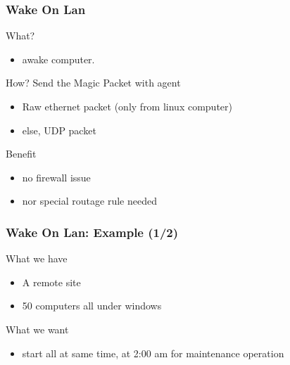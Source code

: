 \documentclass{beamer}
\begin{document}
\begin{frame}
    \frametitle{Wake On Lan}

    \begin{block}{What?}
    \begin{itemize}
        \item awake computer.
    \end{itemize}
    \end{block}

\pause

    \begin{block}{How?}
        Send the Magic Packet with agent
    \begin{itemize}
	\item Raw ethernet packet (only from linux computer)
	\item else, UDP packet
    \end{itemize}
    \end{block}

\pause

    \begin{block}{Benefit}
    \begin{itemize}
        \item no firewall issue
        \item nor special routage rule needed
    \end{itemize}
    \end{block}

\end{frame}

\begin{frame}
    \frametitle{Wake On Lan: Example (1/2)}

    \begin{block}{What we have}
    \begin{itemize}
    \item A remote site
    \item 50 computers all under windows
    \end{itemize}
    \end{block}


    \begin{block}{What we want}
    \begin{itemize}
    \item start all at same time, at 2:00 am for maintenance operation
    \end{itemize}
    \end{block}

\end{frame}
\end{document}
